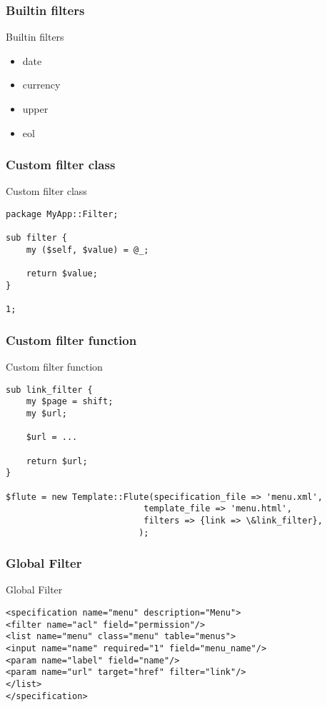 \subsubsection{Builtin filters}
\begin{frame}{Builtin filters}
\begin{itemize}
\item date
\item currency
\item upper
\item eol
\end{itemize}
\end{frame}

\subsubsection{Custom filter class}
\begin{frame}[fragile]{Custom filter class}
\begin{lstlisting}
package MyApp::Filter;

sub filter {
    my ($self, $value) = @_;

    return $value;
}

1;
\end{lstlisting}
\end{frame}

\subsubsection{Custom filter function}
\begin{frame}[fragile]{Custom filter function}
\begin{lstlisting}
sub link_filter {
    my $page = shift;
    my $url;

    $url = ...
    
    return $url;
}

$flute = new Template::Flute(specification_file => 'menu.xml',
						   template_file => 'menu.html',
						   filters => {link => \&link_filter},
						  );
\end{lstlisting}
\end{frame}

\subsubsection{Global Filter}
\begin{frame}[fragile]{Global Filter}
\begin{lstlisting}
<specification name="menu" description="Menu">
<filter name="acl" field="permission"/>
<list name="menu" class="menu" table="menus">
<input name="name" required="1" field="menu_name"/>
<param name="label" field="name"/>
<param name="url" target="href" filter="link"/>
</list>
</specification>
\end{lstlisting}
\end{frame}

